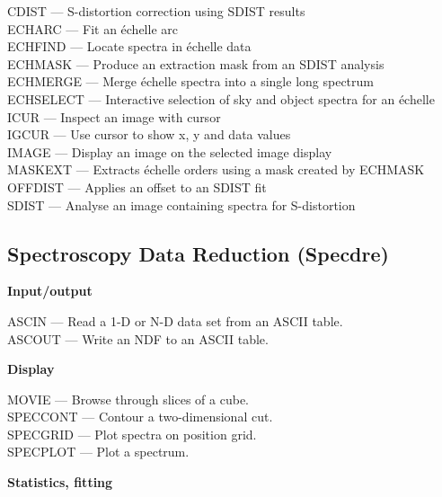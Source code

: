 \documentclass[11pt,twoside]{article}
\newcommand{\htmlref}[2]{#1}
\newcommand{\xlabel}[1]{}
\begin{document}
\htmlref{CDIST}{CDIST} --- S-distortion correction using SDIST results\\
\htmlref{ECHARC}{ECHARC} --- Fit an \'echelle arc\\
\htmlref{ECHFIND}{ECHFIND} --- Locate spectra in \'echelle data\\
\htmlref{ECHMASK}{ECHMASK} --- Produce an extraction mask from an SDIST analysis\\
\htmlref{ECHMERGE}{ECHMERGE} --- Merge \'echelle spectra into a single long spectrum\\
\htmlref{ECHSELECT}{ECHSELECT} --- Interactive selection of sky and object spectra for an \'echelle\\
\htmlref{ICUR}{ICUR} --- Inspect an image with cursor\\
\htmlref{IGCUR}{IGCUR} --- Use cursor to show x, y and data values\\
\htmlref{IMAGE}{IMAGE} --- Display an image on the selected image display\\
\htmlref{MASKEXT}{MASKEXT} --- Extracts \'echelle orders using a mask created by ECHMASK\\
\htmlref{OFFDIST}{OFFDIST} --- Applies an offset to an SDIST fit\\
\htmlref{SDIST}{SDIST} --- Analyse an image containing spectra for S-distortion


\subsection{\label{classifspecdre}\xlabel{classifspecdre}Spectroscopy Data Reduction (Specdre)}

{\bf Input/output}

\htmlref{ASCIN}{ASCIN} --- Read a 1-D or N-D data set from an ASCII table.\\
\htmlref{ASCOUT}{ASCOUT} --- Write an NDF to an ASCII table.

{\bf Display}

\htmlref{MOVIE}{MOVIE} --- Browse through slices of a cube.\\
\htmlref{SPECCONT}{SPECCONT} --- Contour a two-dimensional cut.\\
\htmlref{SPECGRID}{SPECGRID} --- Plot spectra on position grid.\\
\htmlref{SPECPLOT}{SPECPLOT} --- Plot a spectrum.

{\bf Statistics, fitting}
\end{document}
